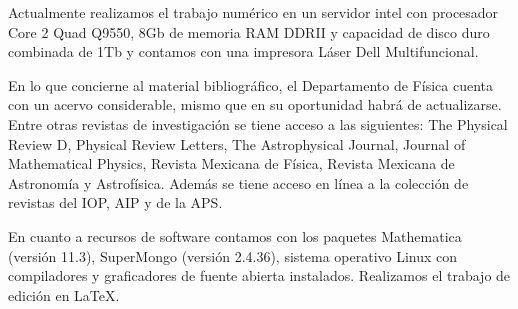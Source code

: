 \documentclass[12pt,spanish]{article}
\begin{document}
Actualmente realizamos el trabajo numérico  en un
servidor intel con procesador Core 2 Quad Q9550, 8Gb de memoria RAM
DDRII y capacidad de disco duro combinada de 1Tb
y contamos con una impresora Láser Dell Multifuncional.

En lo que concierne al material bibliográfico, el Departamento de
Física cuenta con un acervo considerable, mismo que en su
oportunidad habrá de actualizarse. Entre otras revistas
de investigación se tiene acceso a las siguientes: The Physical
Review D, Physical Review Letters, The Astrophysical Journal, Journal
of Mathematical Physics, Revista Mexicana de Física, Revista
Mexicana de Astronomía y Astrofísica. Además se tiene acceso en
línea a la colección de revistas del IOP, AIP y de la APS.  

En cuanto a recursos de software contamos con los paquetes
Mathematica (versión 11.3), SuperMongo
(versión 2.4.36), sistema operativo Linux con compiladores y
graficadores de fuente abierta instalados. Realizamos el trabajo 
de edición en \LaTeX .
\end{document}
